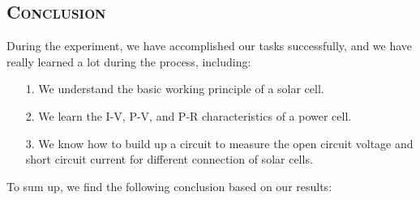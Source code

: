 \documentclass[a4paper,12pt]{article}
\begin{document}
\subsection{\textsc{Conclusion}}
During the experiment, we have accomplished our tasks successfully, and we have really learned a lot during the process, including:
\begin{itemize}
\item[1.] We understand the basic working principle of a solar cell.
\item[2.] We learn the I-V, P-V, and P-R characteristics of a power cell. 
\item[3.] We know how to build up a circuit to measure the open circuit voltage and short circuit current for different connection of solar cells.
\end{itemize}
\par To sum up, we find the following conclusion based on our results:
\end{document}
